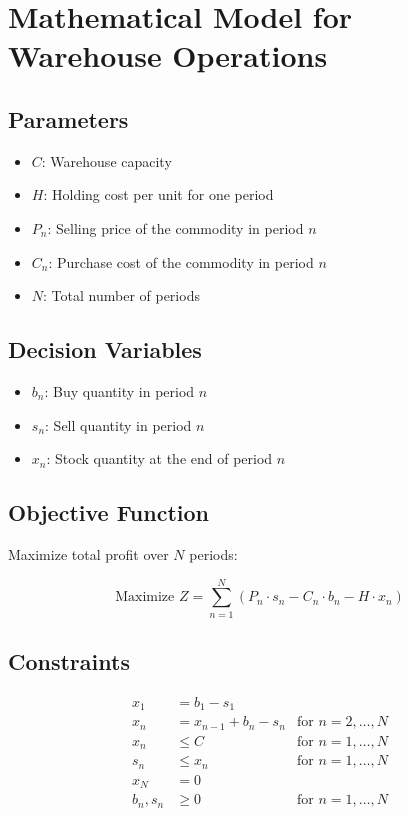 \documentclass{article}
\begin{document}
\section*{Mathematical Model for Warehouse Operations}

\subsection*{Parameters}
\begin{itemize}
    \item \( C \): Warehouse capacity
    \item \( H \): Holding cost per unit for one period
    \item \( P_n \): Selling price of the commodity in period \( n \)
    \item \( C_n \): Purchase cost of the commodity in period \( n \)
    \item \( N \): Total number of periods
\end{itemize}

\subsection*{Decision Variables}
\begin{itemize}
    \item \( b_n \): Buy quantity in period \( n \)
    \item \( s_n \): Sell quantity in period \( n \)
    \item \( x_n \): Stock quantity at the end of period \( n \)
\end{itemize}

\subsection*{Objective Function}
Maximize total profit over \( N \) periods:

\[
\text{Maximize } Z = \sum_{n=1}^{N} (P_n \cdot s_n - C_n \cdot b_n - H \cdot x_n)
\]

\subsection*{Constraints}
\begin{align*}
    x_1 &= b_1 - s_1 \\
    x_n &= x_{n-1} + b_n - s_n & \text{for } n = 2, \ldots, N \\
    x_n &\leq C & \text{for } n = 1, \ldots, N \\
    s_n &\leq x_n & \text{for } n = 1, \ldots, N \\
    x_N &= 0 \\
    b_n, s_n &\geq 0 & \text{for } n = 1, \ldots, N
\end{align*}
\end{document}
